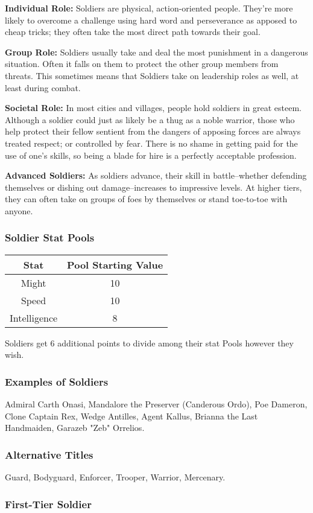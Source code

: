 \documentclass[a4paper,10pt,final,twocolumn,oneside]{book}
\newcommand{\statPool}[5]
{
	\subsubsection*{#1 Stat Pools}
	\label{subsub:#1StatPools}
	\begin{center}
	\begin{tabular}{ |c|c| }
	\hline
	\textbf{Stat} & \textbf{Pool Starting Value} \\
	\hline \hline
	Might & #2 \\
	\hline
 	Speed & #3  \\
 	\hline
 	Intelligence & #4  \\
 	\hline
	\end{tabular}
	\end{center}
	#1s get #5 additional points to divide among their stat Pools however they wish.
}
\newcommand{\itemLine}[2]{\textbf{#1:}{ #2}\par}
\begin{document}
\itemLine{Individual Role}{Soldiers are physical, action-oriented people. They're more likely to overcome a challenge using hard word and perseverance as apposed to cheap tricks; they often take the most direct path towards their goal.}

\itemLine{Group Role}{Soldiers usually take and deal the most punishment in a dangerous situation. Often it falls on them to protect the other group members from threats. This sometimes means that Soldiers take on leadership roles as well, at least during combat.}

\itemLine{Societal Role}{In most cities and villages, people hold soldiers in great esteem. Although a soldier could just as likely be a thug as a noble warrior, those who help protect their fellow sentient from the dangers of apposing forces are always treated respect; or controlled by fear. There is no shame in getting paid for the use of one’s skills, so being a blade for hire is a perfectly acceptable profession.}

\itemLine{Advanced Soldiers}{As soldiers advance, their skill in battle--whether defending themselves or dishing out damage--increases to impressive levels. At higher tiers, they can often take on groups of foes by themselves or stand toe-to-toe with anyone.}

\statPool{Soldier}{10}{10}{8}{6}

\subsubsection*{Examples of Soldiers}
\label{subsub:soldierExamples}

Admiral Carth Onasi, Mandalore the Preserver (Canderous Ordo), Poe Dameron, Clone Captain Rex, Wedge Antilles, Agent Kallus, Brianna the Last Handmaiden, Garazeb "Zeb" Orrelios.

\subsubsection*{Alternative Titles}
\label{subsub:soldierAlternative}

Guard, Bodyguard, Enforcer, Trooper, Warrior, Mercenary.


\subsubsection*{First-Tier Soldier}
\label{subsub:soldierFirstTier}
\end{document}
